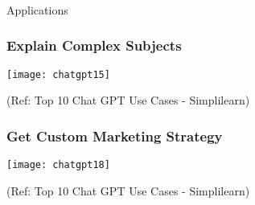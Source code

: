 \begin{frame}[fragile]\frametitle{}
\begin{center}
{\Large Applications}
\end{center}
\end{frame}




\begin{frame}[fragile]\frametitle{Explain Complex Subjects}
\begin{center}
\texttt{[image: chatgpt15]}
\end{center}
	
{\tiny (Ref: Top 10 Chat GPT Use Cases - Simplilearn)}
\end{frame}






\begin{frame}[fragile]\frametitle{Get Custom Marketing Strategy}
\begin{center}
\texttt{[image: chatgpt18]}
\end{center}

{\tiny (Ref: Top 10 Chat GPT Use Cases - Simplilearn)}
\end{frame}

